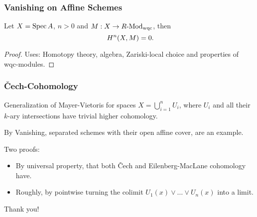 \documentclass{beamer}
\begin{document}
\begin{frame}
  \frametitle{Vanishing on Affine Schemes}
  \begin{theorem}
    Let $X=\operatorname{Spec} A$, $n>0$ and $M:X\to R\text{-}\mathrm{Mod}_{\mathrm{wqc}}$, then
    \[
      H^n(X,M)=0
      \rlap{.}
    \]
  \end{theorem}
  \pause
  \begin{proof}
    Uses: Homotopy theory, algebra, Zariski-local choice and properties of wqc-modules.
  \end{proof}
\end{frame}

\begin{frame}
  \frametitle{\v{C}ech-Cohomology}
  Generalization of Mayer-Vietoris for spaces $X=\bigcup_{i=1}^nU_i$, where $U_i$ and all their $k$-ary intersections have trivial higher cohomology.
  
  \pause
  By Vanishing, separated schemes with their open affine cover, are an example.
  
  \pause
  Two proofs:
  \begin{itemize}
  \item By universal property, that both \v{C}ech and Eilenberg-MacLane cohomology have.
  \item Roughly, by pointwise turning the colimit $U_1(x)\vee\dots\vee U_n(x)$ into a limit.
  \end{itemize}
\end{frame}

\begin{frame}
  \centering
  Thank you!
\end{frame}
\end{document}
